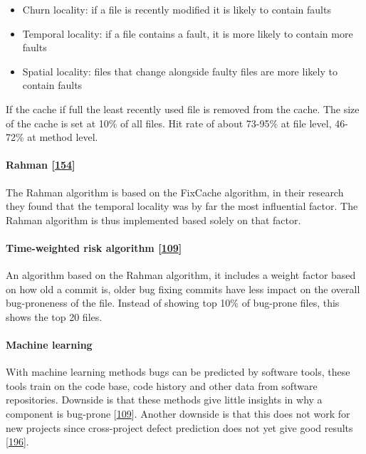 \documentclass[]{book}
\providecommand{\tightlist}{%
  \setlength{\itemsep}{0pt}\setlength{\parskip}{0pt}}
\let\oldparagraph\paragraph
\renewcommand{\paragraph}[1]{\oldparagraph{#1}\mbox{}}
\begin{document}
\begin{itemize}
\tightlist
\item
  Churn locality: if a file is recently modified it is likely to contain
  faults
\item
  Temporal locality: if a file contains a fault, it is more likely to
  contain more faults
\item
  Spatial locality: files that change alongside faulty files are more
  likely to contain faults
\end{itemize}

If the cache if full the least recently used file is removed from the
cache. The size of the cache is set at 10\% of all files. Hit rate of
about 73-95\% at file level, 46-72\% at method level.

\paragraph{\texorpdfstring{Rahman
{[}\protect\hyperlink{ref-rahman2011}{154}{]}}{Rahman {[}154{]}}}\label{rahman-rahman2011}

The Rahman algorithm is based on the FixCache algorithm, in their
research they found that the temporal locality was by far the most
influential factor. The Rahman algorithm is thus implemented based
solely on that factor.

\paragraph{\texorpdfstring{Time-weighted risk algorithm
{[}\protect\hyperlink{ref-Lewis2013}{109}{]}}{Time-weighted risk algorithm {[}109{]}}}\label{time-weighted-risk-algorithm-lewis2013}

An algorithm based on the Rahman algorithm, it includes a weight factor
based on how old a commit is, older bug fixing commits have less impact
on the overall bug-proneness of the file. Instead of showing top 10\% of
bug-prone files, this shows the top 20 files.

\paragraph{Machine learning}\label{machine-learning}

With machine learning methods bugs can be predicted by software tools,
these tools train on the code base, code history and other data from
software repositories. Downside is that these methods give little
insights in why a component is bug-prone
{[}\protect\hyperlink{ref-Lewis2013}{109}{]}. Another downside is that
this does not work for new projects since cross-project defect
prediction does not yet give good results
{[}\protect\hyperlink{ref-zimmermann2009}{196}{]}.
\end{document}

